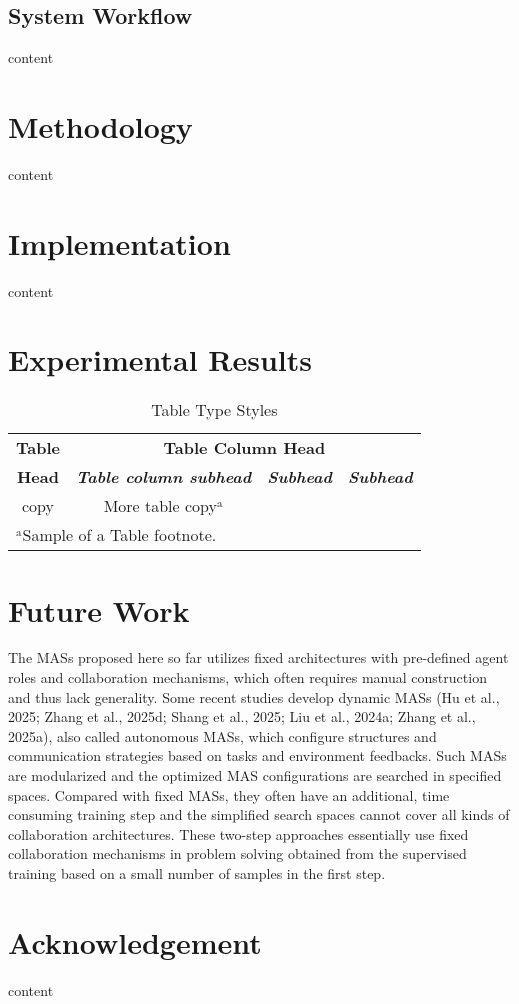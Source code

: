 \documentclass[conference]{IEEEtran}
\begin{document}
\subsection{System Workflow}
content
\section{Methodology}
content
\section{Implementation}
content
\section{Experimental Results}
\begin{table}[htbp]
\caption{Table Type Styles}
\begin{center}
\begin{tabular}{|c|c|c|c|}
\hline
\textbf{Table}&\multicolumn{3}{|c|}{\textbf{Table Column Head}} \\
\cline{2-4} 
\textbf{Head} & \textbf{\textit{Table column subhead}}& \textbf{\textit{Subhead}}& \textbf{\textit{Subhead}} \\
\hline
copy& More table copy$^{\mathrm{a}}$& &  \\
\hline
\multicolumn{4}{l}{$^{\mathrm{a}}$Sample of a Table footnote.}
\end{tabular}
\label{tab1}
\end{center}
\end{table}

\section{Future Work}
The MASs proposed here so far utilizes fixed architectures with pre-defined agent roles and collaboration mechanisms, which often requires manual construction and thus lack generality.
Some recent studies develop dynamic MASs (Hu et al., 2025; Zhang et al., 2025d; Shang et al., 2025; Liu et al., 2024a; Zhang et 
al., 2025a), also called autonomous MASs, which configure structures and communication strategies based on tasks
and environment feedbacks. Such MASs are modularized and the optimized MAS configurations
are searched in specified spaces. Compared with
fixed MASs, they often have an additional, time consuming training step and the simplified search
spaces cannot cover all kinds of collaboration architectures. These two-step approaches essentially use
fixed collaboration mechanisms in problem solving
obtained from the supervised training based on a
small number of samples in the first step.
\section{Acknowledgement}
content

\end{document}
